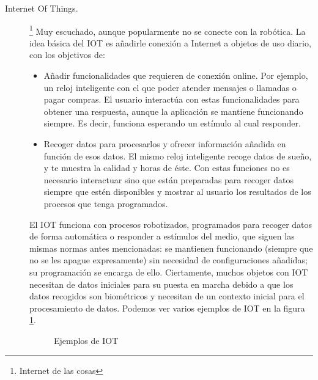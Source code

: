 \begin{description}
	\item [Internet Of Things.]\footnote{Internet de las cosas} Muy escuchado, aunque popularmente no se conecte con la robótica. La idea básica del IOT es añadirle conexión a Internet a objetos de uso diario, con los objetivos de:
	\begin{itemize}
		\item Añadir funcionalidades que requieren de conexión online. Por ejemplo, un reloj inteligente con el que poder atender mensajes o llamadas o pagar compras. El usuario interactúa con estas funcionalidades para obtener una respuesta, aunque la aplicación se mantiene funcionando siempre. Es decir, funciona esperando un estímulo al cual responder.
		\item Recoger datos para procesarlos y ofrecer información añadida en función de esos datos. El mismo reloj inteligente recoge datos de sueño, y te muestra la calidad y horas de éste. Con estas funciones no es necesario interactuar sino que están preparadas para recoger datos siempre que estén disponibles y mostrar al usuario los resultados de los procesos que tenga programados.
	\end{itemize}
	El IOT funciona con procesos robotizados, programados para recoger datos de forma automática o responder a estímulos del medio, que siguen las mismas normas antes mencionadas: se mantienen funcionando (siempre que no se les apague expresamente) sin necesidad de configuraciones añadidas; su programación se encarga de ello. Ciertamente, muchos objetos con IOT necesitan de datos iniciales para su puesta en marcha debido a que los datos recogidos son biométricos y necesitan de un contexto inicial para el procesamiento de datos. Podemos ver varios ejemplos de IOT en la figura \ref{img:IOT}.
	\begin{figure}[h]
		\centering
		\begin{subfigure}
			[Información de la calidad del sueño proporcionada por un reloj inteligente] {
			\texttt{[image: IOT1.jpg]}
			\label{img:IOT1}}
		\end{subfigure}
		\begin{subfigure}
			[Báscula inteligente que procesa los datos almacenados] {
			\texttt{[image: IOT2.jpg]}
			\label{img:IOT2}}
		\end{subfigure}
		\newline
		\begin{subfigure}[c]
			[Aplicación conectada a un sensor de glucosa para controlar el nivel de azúcar] {
			\texttt{[image: IOT3.jpeg]}
			\label{img:IOT3}}
		\end{subfigure}
		\caption{Ejemplos de IOT}
		\label{img:IOT}
	\end{figure}


\end{description}
